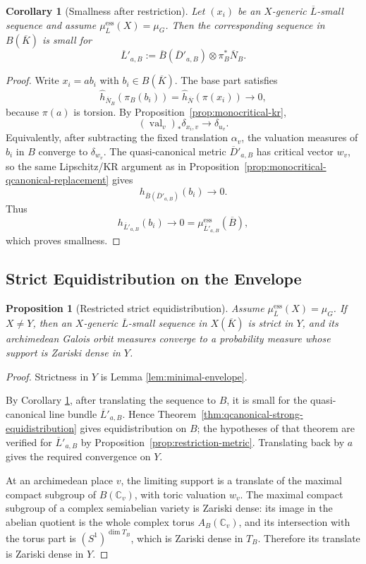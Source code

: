 \documentclass[10pt,a4paper]{amsart}
\theoremstyle{plain}
\newtheorem{corollary}[theorem]{Corollary}
\newtheorem{proposition}[theorem]{Proposition}
\DeclareMathOperator{\val}{val}
\theoremstyle{plain}
\numberwithin{equation}{section}
\providecommand{\bD}{\overline{D}}
\providecommand{\bL}{\overline{L}}
\providecommand{\bN}{\overline{N}}
\providecommand{\muess}{\mu^{\mathrm{ess}}}
\begin{document}
\begin{corollary}[Smallness after restriction]\label{cor:restricted-smallness}
	Let \((x_i)\) be an \(X\)-generic \(\bL\)-small sequence and assume
	\(\muess_{\bL}(X)=\mu_G\).  Then the corresponding sequence in \(B(\overline{K})\) is
	small for
	\[
	\bL'_{a,B}:=\overline B(\bD'_{a,B})\otimes\pi_B^*\bN_B.
	\]
\end{corollary}

\begin{proof}
	Write \(x_i=a b_i\) with \(b_i\in B(\overline{K})\).  The base part satisfies
	\[
	\hat h_{\bN_B}(\pi_B(b_i))=\hat h_{\bN}(\pi(x_i))\to0,
	\]
	because \(\pi(a)\) is torsion.  By
	Proposition~\ref{prop:monocritical-kr},
	\[
	(\val_v)_*\delta_{x_i,v}\to\delta_{u_v}.
	\]
	Equivalently, after subtracting the fixed translation \(\alpha_v\), the
	valuation measures of \(b_i\) in \(B\) converge to \(\delta_{w_v}\).
	The quasi-canonical metric \(\bD'_{a,B}\) has critical vector \(w_v\), so the
	same Lipschitz/KR argument as in
	Proposition~\ref{prop:monocritical-qcanonical-replacement} gives
	\[
	h_{\overline B(\bD'_{a,B})}(b_i)\to0.
	\]
	Thus
	\[
	h_{\bL'_{a,B}}(b_i)\to0
	=\muess_{\bL'_{a,B}}(\overline B),
	\]
	which proves smallness.
\end{proof}

\subsection{Strict Equidistribution on the Envelope}

\begin{proposition}[Restricted strict equidistribution]\label{prop:restricted-eq}
	Assume \(\muess_{\bL}(X)=\mu_G\).  If \(X\neq Y\), then an \(X\)-generic
	\(\bL\)-small sequence in \(X(\overline{K})\) is strict in \(Y\), and its
	archimedean Galois orbit measures converge to a probability measure whose
	support is Zariski dense in \(Y\).
\end{proposition}

\begin{proof}
	Strictness in \(Y\) is Lemma \ref{lem:minimal-envelope}.
	
	By Corollary \ref{cor:restricted-smallness}, after translating the sequence to
	\(B\), it is small for the quasi-canonical line bundle \(\bL'_{a,B}\).  Hence
	Theorem~\ref{thm:qcanonical-strong-equidistribution} gives equidistribution on
	\(B\); the hypotheses of that theorem are verified for \(\bL'_{a,B}\) by
	Proposition~\ref{prop:restriction-metric}.  Translating back by \(a\) gives
	the required convergence on \(Y\).
	
	At an archimedean place \(v\), the limiting support is a translate of the
	maximal compact subgroup of \(B(\mathbb C_v)\), with toric valuation \(w_v\).
	The maximal compact subgroup of a complex semiabelian variety is Zariski dense:
	its image in the abelian quotient is the whole complex torus
	\(A_B(\mathbb C_v)\), and its intersection with the torus part is
	\((S^1)^{\dim T_B}\), which is Zariski dense in \(T_B\).  Therefore its
	translate is Zariski dense in \(Y\).
\end{proof}
\end{document}
